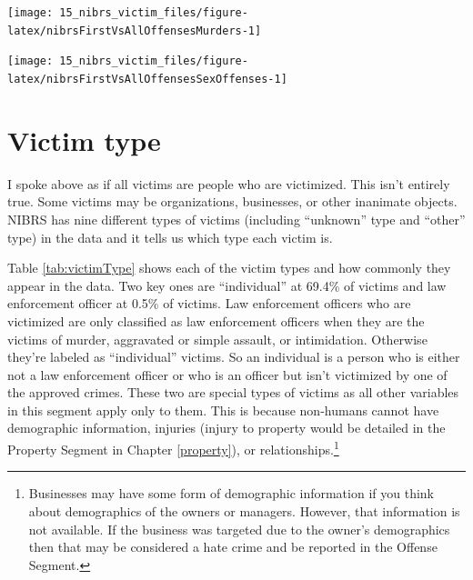 \documentclass[
]{krantz}
\let\origfigure\figure
\let\endorigfigure\endfigure
\renewenvironment{figure}[1][2] {
    \expandafter\origfigure\expandafter[H]
} {
    \endorigfigure
}
\begin{document}
\begin{figure}

{\centering \texttt{[image: 15\_nibrs\_victim\_files/figure-latex/nibrsFirstVsAllOffensesMurders-1]} 

}

\caption{The numbers of murders when considering only the first offense or all offenses, 1991-2022.}\label{fig:nibrsFirstVsAllOffensesMurders}
\end{figure}

\begin{figure}

{\centering \texttt{[image: 15\_nibrs\_victim\_files/figure-latex/nibrsFirstVsAllOffensesSexOffenses-1]} 

}

\caption{The numbers of sexual offenders when considering only the first offense or all offenses, 1991-2022.}\label{fig:nibrsFirstVsAllOffensesSexOffenses}
\end{figure}

\section{Victim type}\label{victim-type}

I spoke above as if all victims are people who are
victimized. This isn't entirely true. Some victims may be
organizations, businesses, or other inanimate objects. NIBRS
has nine different types of victims (including ``unknown''
type and ``other'' type) in the data and it tells us which
type each victim is.

Table \ref{tab:victimType} shows each of the victim types
and how commonly they appear in the data. Two key ones are
``individual'' at 69.4\% of victims and law enforcement
officer at 0.5\% of victims. Law enforcement officers who
are victimized are only classified as law enforcement
officers when they are the victims of murder, aggravated or
simple assault, or intimidation. Otherwise they're labeled
as ``individual'' victims. So an individual is a person who
is either not a law enforcement officer or who is an officer
but isn't victimized by one of the approved crimes. These
two are special types of victims as all other variables in
this segment apply only to them. This is because non-humans
cannot have demographic information, injuries (injury to
property would be detailed in the Property Segment in
Chapter \ref{property}), or relationships.\footnote{Businesses
  may have some form of demographic information if you think
  about demographics of the owners or managers. However,
  that information is not available. If the business was
  targeted due to the owner's demographics then that may be
  considered a hate crime and be reported in the Offense
  Segment.}
\end{document}
